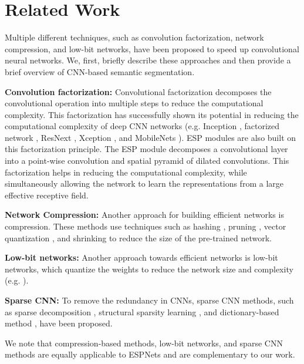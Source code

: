 \documentclass[runningheads]{llncs}
\begin{document}
\section{Related Work}
Multiple different techniques, such as convolution factorization, network compression, and low-bit networks, have been proposed to speed up convolutional neural networks. We, first, briefly describe these approaches and then provide a brief overview of CNN-based semantic segmentation.

\noindent \textbf{Convolution factorization:} Convolutional factorization decomposes the convolutional operation into multiple steps to reduce the computational complexity. This factorization has successfully shown its potential in reducing the computational complexity of deep CNN networks (e.g. Inception \cite{szegedy2015going,szegedy2016rethinking,SzegedyIV16InceptionV4}, factorized network \cite{jin2014flattened}, ResNext \cite{xie2017aggregated}, Xception \cite{chollet2016xception}, and MobileNets \cite{howard2017mobilenets}). ESP modules are also built on this factorization principle. The ESP module decomposes a convolutional layer into a point-wise convolution and spatial pyramid of dilated convolutions. This factorization helps in reducing the computational complexity, while simultaneously allowing the network to learn the representations from a large effective receptive field.

\noindent \textbf{Network Compression:} Another approach for building efficient networks is compression. These methods use techniques such as hashing \cite{chen2015compressing}, pruning \cite{han2015deep}, vector quantization \cite{wu2016quantized}, and shrinking \cite{zhao2017icnet,jaderberg2014speeding} to reduce the size of the pre-trained network.

\noindent \textbf{Low-bit networks:} Another approach towards efficient networks is low-bit networks, which quantize the weights to reduce the network size and complexity (e.g. \cite{rastegari2016xnor,Hwang2014fixed,courbariaux2016binarized,hubara2016quantized}). 

\noindent \textbf{Sparse CNN:} To remove the redundancy in CNNs, sparse CNN methods, such as sparse decomposition \cite{liu2015sparse}, structural sparsity learning \cite{wen2016learning}, and dictionary-based method \cite{bagherinezhad2017lcnn}, have been proposed. 

We note that compression-based methods, low-bit networks, and sparse CNN methods are equally applicable to ESPNets and are complementary to our work.
\end{document}
